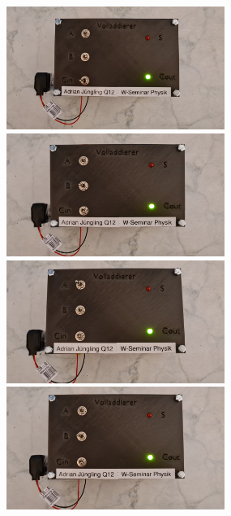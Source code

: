 \begin{figure}[h!]
	\centering
	\begin{minipage}{.5\textwidth}
		\centering
		\includegraphics[height=4cm, keepaspectratio]{./Fotos/FA-0.jpg}
		\vspace{.5cm}
	\end{minipage}%
	\begin{minipage}{.5\textwidth}
		\centering
		\includegraphics[height=4cm, keepaspectratio]{./Fotos/FA-1.jpg}
		\vspace{.5cm}
	\end{minipage}
	\begin{minipage}{.5\textwidth}
		\centering
		\includegraphics[height=4cm, keepaspectratio]{./Fotos/FA-2.jpg}
		\vspace{.5cm}
	\end{minipage}%
	\begin{minipage}{.5\textwidth}
		\centering
		\includegraphics[height=4cm, keepaspectratio]{./Fotos/FA-3.jpg}

\end{minipage}
\end{figure}
